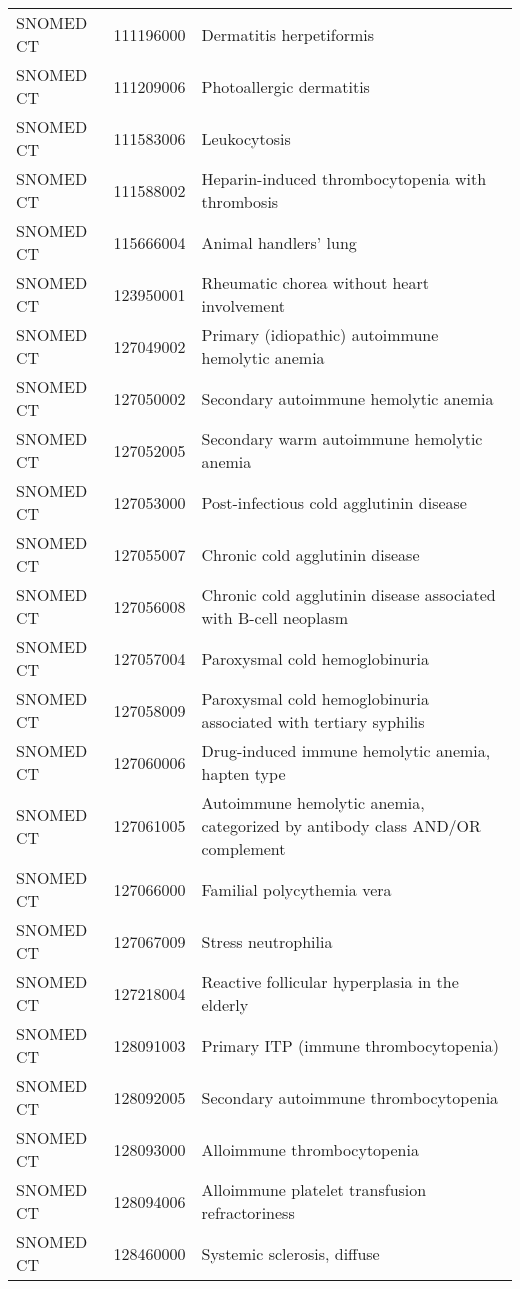 \begin{longtable}{p{}p{}p{}}
  SNOMED CT & 111196000 & Dermatitis herpetiformis \\ 
  SNOMED CT & 111209006 & Photoallergic dermatitis \\ 
  SNOMED CT & 111583006 & Leukocytosis \\ 
  SNOMED CT & 111588002 & Heparin-induced thrombocytopenia with thrombosis \\ 
  SNOMED CT & 115666004 & Animal handlers' lung \\ 
  SNOMED CT & 123950001 & Rheumatic chorea without heart involvement \\ 
  SNOMED CT & 127049002 & Primary (idiopathic) autoimmune hemolytic anemia \\ 
  SNOMED CT & 127050002 & Secondary autoimmune hemolytic anemia \\ 
  SNOMED CT & 127052005 & Secondary warm autoimmune hemolytic anemia \\ 
  SNOMED CT & 127053000 & Post-infectious cold agglutinin disease \\ 
  SNOMED CT & 127055007 & Chronic cold agglutinin disease \\ 
  SNOMED CT & 127056008 & Chronic cold agglutinin disease associated with B-cell neoplasm \\ 
  SNOMED CT & 127057004 & Paroxysmal cold hemoglobinuria \\ 
  SNOMED CT & 127058009 & Paroxysmal cold hemoglobinuria associated with tertiary syphilis \\ 
  SNOMED CT & 127060006 & Drug-induced immune hemolytic anemia, hapten type \\ 
  SNOMED CT & 127061005 & Autoimmune hemolytic anemia, categorized by antibody class AND/OR complement \\ 
  SNOMED CT & 127066000 & Familial polycythemia vera \\ 
  SNOMED CT & 127067009 & Stress neutrophilia \\ 
  SNOMED CT & 127218004 & Reactive follicular hyperplasia in the elderly \\ 
  SNOMED CT & 128091003 & Primary ITP (immune thrombocytopenia) \\ 
  SNOMED CT & 128092005 & Secondary autoimmune thrombocytopenia \\ 
  SNOMED CT & 128093000 & Alloimmune thrombocytopenia \\ 
  SNOMED CT & 128094006 & Alloimmune platelet transfusion refractoriness \\ 
  SNOMED CT & 128460000 & Systemic sclerosis, diffuse \\ 

\end{longtable}
